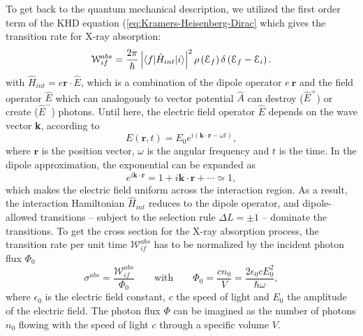 To get back to the quantum mechanical description, we utilized the first order term of the KHD equation (\ref{eq:Kramers-Heisenberg-Dirac} which gives the transition rate for X-ray absorption:
\begin{equation}
    \mathcal{W}_{if}^{abs} = \frac{2\pi}{\hbar}\left|\braket{f|\hat{H}_{int}|i}\right|^{2} \rho\left(\mathcal{E}_{f}\right)\delta\left(\mathcal{E}_{f}-\mathcal{E}_{i}\right).
    \label{eq:XAS_transition_rate}
\end{equation}
with $\hat{H}_{int} = e \textbf{r}\cdot\hat{E}$, which is a combination of the dipole operator $e\ \textbf{r}$ and the field operator $\hat{E}$ which can analogously to vector potential $\hat{A}$ can destroy ($\hat{E}^{+}$) or create ($\hat{E}^{-}$) photons. Until here, the electric field operator $\hat{E}$ depends on the wave vector \textbf{k}, according to  
\begin{equation}
    E(\textbf{r}, t) = E_{0}e^{i\left(\textbf{k}\cdot\textbf{r}-\omega t\right)},
    \label{eq:electric_field}
\end{equation}
where $\textbf{r}$ is the position vector, $\omega$ is the angular frequency and $t$ is the time. In the dipole approximation, the exponential can be expanded as 
\begin{equation}
   e^{i\textbf{k}\cdot\textbf{r}} = 1 + i\textbf{k}\cdot\textbf{r} + \cdots \simeq 1, 
    \label{eq:exponential_expansion}
\end{equation}
which makes the electric field uniform across the interaction region. As a result, the interaction Hamiltonian $\hat{H}_{int}$ reduces to the dipole operator, and dipole-allowed transitions -- subject to the selection rule $\Delta L = \pm 1$ -- dominate the transitions. To get the cross section for the X-ray absorption process, the transition rate per unit time $\mathcal{W}_{if}^{abs}$ has to be normalized by the incident photon flux $\Phi_{0}$
\begin{equation}
    \sigma^{abs} = \frac{\mathcal{W}_{if}^{abs}}{\Phi_{0}} \qquad \mathrm{with} \qquad \Phi_{0}=\frac{c n_{0}}{V}=\frac{2\epsilon_{0}cE^{2}_{0}}{\hbar\omega},
    \label{eq:XAS_cross_section}
\end{equation}
where $\epsilon_{0}$ is the electric field constant, $c$ the speed of light and $E_{0}$ the amplitude of the electric field. The photon flux $\Phi$ can be imagined as the number of photons $n_{0}$ flowing with the speed of light $c$ through a specific volume $V$.\\
